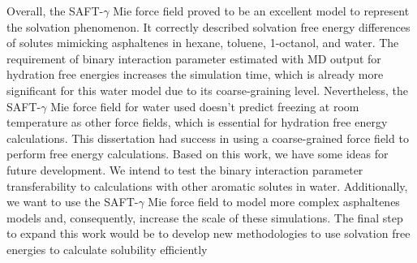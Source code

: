 Overall, the SAFT-$\gamma$ Mie force field proved to be an excellent model to represent the solvation
phenomenon. It correctly described solvation free energy differences of solutes
mimicking asphaltenes in hexane, toluene, 1-octanol, and water. The requirement of
binary interaction parameter estimated with MD output for hydration free energies
increases the simulation time, which is already more significant for this water model due to its
coarse-graining level. Nevertheless, the SAFT-$\gamma$ Mie force field for water used doesn’t predict freezing at room temperature as other force fields, which is essential for hydration
free energy calculations.
This dissertation had success in using a coarse-grained force field to perform
free energy calculations. Based on this work, we have some ideas for future development. We intend to test the binary interaction parameter transferability to calculations with other
aromatic solutes in water. Additionally, we want to use the SAFT-$\gamma$ Mie force field to model more
complex asphaltenes models and, consequently, increase the scale of these simulations. The final step to expand this work would be to develop new methodologies to use solvation free energies to calculate solubility efficiently


